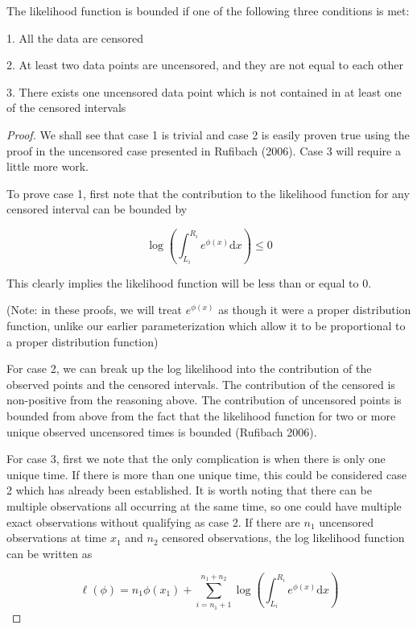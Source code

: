 \documentclass[10pt]{article}
\begin{document}
	The likelihood function is bounded if one of the following three conditions is met:
	
	1. All the data are censored
	
	2. At least two data points are uncensored, and they are not equal to each other
	
	3. There exists one uncensored data point which is not contained in at least one of the censored intervals
		
	\begin{proof}
	
	We shall see that case 1 is trivial and case 2 is easily proven true using the proof in the uncensored case presented in Rufibach (2006). Case 3 will require a little more work. 
	
	To prove case 1, first note that the contribution to the likelihood function for any censored interval can be bounded by
	
	\[
	\displaystyle \log \left( \int_{L_i}^{R_i} e^{\phi(x)} \mathrm{d}x \right) \leq 0
	\]
	
	This clearly implies the likelihood function will be less than or equal to 0. 

	(Note: in these proofs, we will treat $e^{\phi(x)}$ as though it were a proper distribution function, unlike our earlier parameterization which allow it to be proportional to a proper distribution function)
		
	For case 2, we can break up the log likelihood into the contribution of the observed points and the censored intervals. The contribution of the censored is non-positive from the reasoning above. The contribution of uncensored points is bounded from above from the fact that the likelihood function for two or more unique observed uncensored times is bounded (Rufibach 2006).
	
	For case 3, first we note that the only complication is when there is only one unique time. If there is more than one unique time, this could be considered case 2 which has already been established. It is worth noting that there can be multiple observations all occurring at the same time, so one could have multiple exact observations without qualifying as case 2. If there are $n_1$ uncensored observations at time $x_1$ and $n_2$ censored observations, the log likelihood function can be written as
	
	\[
	\ell (\phi) = \displaystyle  n_1\phi(x_1) + \sum_{i = n_1+ 1} ^{n_1 + n_2} \log \left( \int_{L_i}^{R_i} e^{\phi(x) } \mathrm{d}x \right)
	\]
	

\end{proof}
\end{document}
